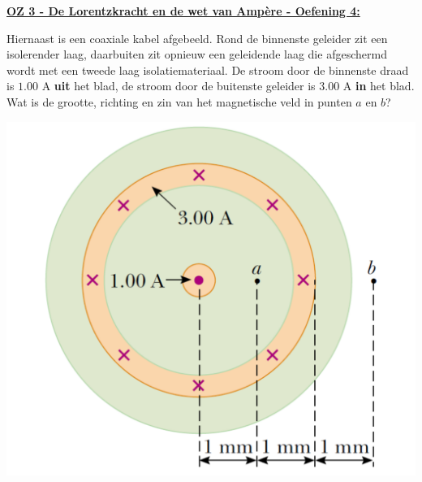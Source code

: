 \textbf{\underline{OZ 3 - De Lorentzkracht en de wet van Ampère - Oefening 4:}}
\vspace{0.5cm}


\begin{minipage}{.76\textwidth}
    Hiernaast is een coaxiale kabel afgebeeld. Rond de binnenste geleider zit een isolerender laag, daarbuiten zit opnieuw een geleidende laag die afgeschermd wordt met een tweede laag isolatiemateriaal. De stroom door de binnenste draad is $1.00$ A \textbf{uit} het blad, de stroom door de buitenste geleider is $3.00$ A \textbf{in} het blad. Wat is de grootte, richting en zin van het magnetische veld in punten $a$ en $b$?

    \vspace{1cm}
\end{minipage}
\begin{minipage}{.2\textwidth}
    \vspace{-0.5cm}
    \includegraphics[scale = 0.225]{oz03/resources/Oz3Oef4.png}
\end{minipage}

\vspace{-0.9cm}

